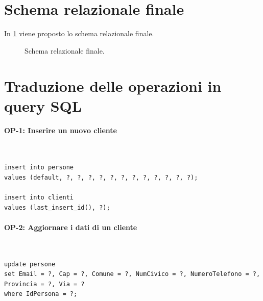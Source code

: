 \documentclass[a4paper,12pt]{report}
\begin{document}
\section{Schema relazionale finale}
In \cref{fig:full-relational} viene proposto lo schema relazionale finale.

\begin{figure}
\centering{}
\caption{Schema relazionale finale.}
\label{fig:full-relational}
\end{figure}
\newpage
\section{Traduzione delle operazioni in query SQL}
\paragraph{OP-1: Inserire un nuovo cliente}\mbox{}\\
\begin{lstlisting}
insert into persone
values (default, ?, ?, ?, ?, ?, ?, ?, ?, ?, ?, ?, ?);

insert into clienti
values (last_insert_id(), ?);
\end{lstlisting}

\paragraph{OP-2: Aggiornare i dati di un cliente}\mbox{}\\
\begin{lstlisting}
update persone
set Email = ?, Cap = ?, Comune = ?, NumCivico = ?, NumeroTelefono = ?, Provincia = ?, Via = ?
where IdPersona = ?;
\end{lstlisting}
    
\end{document}
